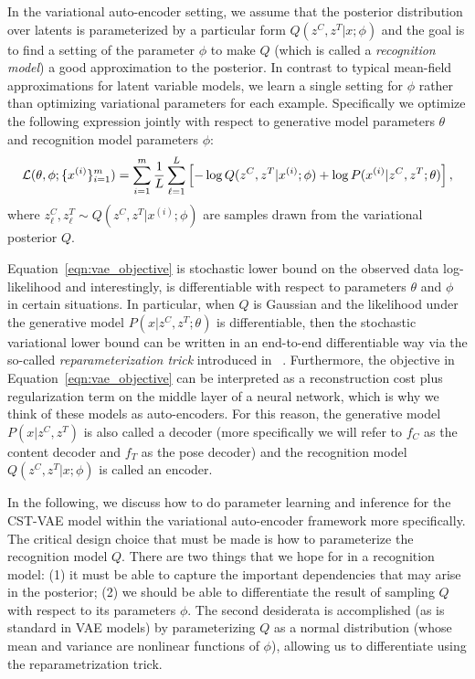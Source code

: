In the variational auto-encoder setting, we assume that the posterior distribution over latents is parameterized by a particular form
 $Q(z^C, z^T|x;\phi)$ and the goal is to find a setting of
the parameter $\phi$ to make $Q$ (which is called a \emph{recognition model}) a good approximation to the posterior.  
In contrast to typical mean-field approximations for latent variable models,
we learn a single setting for $\phi$ rather than optimizing variational parameters for each example. 
Specifically we optimize the following expression
jointly with respect to generative model parameters $\theta$ and recognition model parameters $\phi$:
\begin{equation}\label{eqn:vae_objective}\footnotesize
\mathcal{L}(\theta, \phi; \{x^{(i)}\}_{i=1}^m)
	= \sum_{i=1}^m \frac{1}{L}\sum_{\ell=1}^L \left[-\log Q(z^C, z^T | x^{(i)};\phi) + \log P(x^{(i)} | z^C, z^T; \theta) \right],
\end{equation}
where $z^C_\ell, z^T_\ell \sim Q(z^C, z^T | x^{(i)};\phi) $ are samples drawn from the variational posterior $Q$.

Equation~\ref{eqn:vae_objective} is stochastic lower bound on the observed data log-likelihood and interestingly,
is differentiable with respect to parameters $\theta$ and $\phi$ in certain situations. In particular,
when $Q$ is Gaussian and the likelihood under the generative model $P(x|z^C,z^T; \theta)$ is differentiable, 
then the stochastic variational lower bound can be written in an end-to-end
differentiable way via the so-called \emph{reparameterization trick} introduced in ~\cite{Kingma2014}.
Furthermore, the objective in Equation~\ref{eqn:vae_objective} can be interpreted as a reconstruction cost plus regularization term on the middle layer
of a neural network, which is why we think of these models as auto-encoders.  
For this reason, the generative model $P(x|z^C, z^T )$ is also called a decoder (more specifically we will
refer to $f_C$ as the content decoder and $f_T$ as the pose decoder) and the recognition model $Q(z^C, z^T|x;\phi)$
is called an encoder.

In the following, we discuss how to do parameter learning and inference for the CST-VAE model
within the variational auto-encoder framework more specifically.
The critical design choice that must be made is how to parameterize  the recognition model $Q$. There are two things 
that we hope for in a recognition model: (1) it must be able to 
capture the important dependencies that may arise in the posterior; (2) we should be able to differentiate the result of
sampling $Q$ with respect to its parameters $\phi$.  The second desiderata is accomplished (as is standard in VAE models)
by parameterizing $Q$ as a normal distribution (whose mean and variance are nonlinear functions of $\phi$), allowing us to differentiate using the 
reparametrization trick.  



